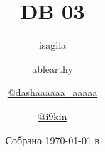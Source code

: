 \title{\huge \textbf{DB \LeC{} 03}}
\author{
  isagila
  \and
  ablearthy
  \and
  \href{https://t.me/dashaaaaaa_aaaaa}{@dashaaaaaa\_aaaaa}
  \and
  \href{https://t.me/i9kin}{@i9kin}
}
\date{Собрано {\ddmmyyyydate\today} в \currenttime}
\newcommand{\githublink}{https://github.com/isagila/tesc}
